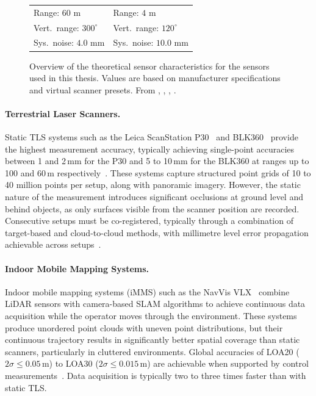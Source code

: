 \begin{figure}[htbp]
{\begin{tabular}{C{6cm} C{6cm}}
            Range: $60$ m &
            Range: $4$ m \\

            Vert.\ range: $300^\circ$ &
            Vert.\ range: $120^\circ$ \\

            Sys.\ noise: $4.0$ mm &
            Sys.\ noise: $10.0$ mm \\

        \end{tabular}%
    }
    \caption[Sensor overview]{Overview of the theoretical sensor characteristics for the sensors used in this thesis. Values are based on manufacturer specifications and virtual scanner presets. From \cite{noauthor_leica_nodate},  \cite{noauthor_navvis_nodate}, \cite{noauthor_leica_nodate-1}, \cite{hubner_evaluation_2020}.}
    \label{fig3:sensors}
\end{figure}

\paragraph{Terrestrial Laser Scanners.}
Static \gls{TLS} systems such as the Leica ScanStation P30~\cite{noauthor_leica_nodate} and BLK360~\cite{noauthor_leica_nodate-1} provide the highest measurement accuracy, typically achieving single-point accuracies between 1 and 2\,mm for the P30 and 5 to 10\,mm for the BLK360 at ranges up to 100 and 60\,m respectively~\cite{bassier_standalone_2016}. These systems capture structured point grids of 10 to 40 million points per setup, along with panoramic imagery. However, the static nature of the measurement introduces significant occlusions at ground level and behind objects, as only surfaces visible from the scanner position are recorded. Consecutive setups must be co-registered, typically through a combination of target-based and cloud-to-cloud methods, with millimetre level error propagation achievable across setups~\cite{geyter_point_2022}.

\paragraph{Indoor Mobile Mapping Systems.}
Indoor mobile mapping systems (\gls{iMMS}) such as the NavVis VLX~\cite{noauthor_navvis_nodate} combine LiDAR sensors with camera-based \gls{SLAM} algorithms to achieve continuous data acquisition while the operator moves through the environment. These systems produce unordered point clouds with uneven point distributions, but their continuous trajectory results in significantly better spatial coverage than static scanners, particularly in cluttered environments. Global accuracies of LOA20 ($2\sigma \leq 0.05$\,m) to LOA30 ($2\sigma \leq 0.015$\,m) are achievable when supported by control measurements~\cite{geyter_point_2022, vermandere_two-step_2022}. Data acquisition is typically two to three times faster than with static \gls{TLS}.

